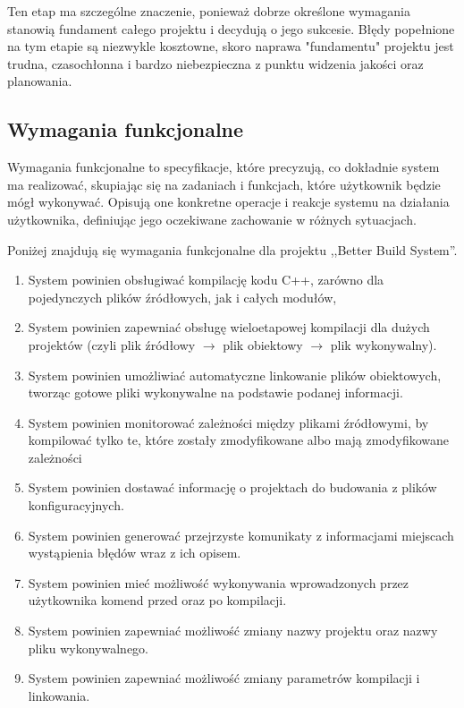 Ten etap  ma szczególne znaczenie, ponieważ dobrze określone wymagania stanowią fundament całego projektu i decydują o jego sukcesie. Błędy popełnione na tym etapie są niezwykle kosztowne, skoro naprawa "fundamentu" projektu jest trudna, czasochłonna i bardzo niebezpieczna z punktu widzenia jakości oraz planowania.

\subsection{Wymagania funkcjonalne}
Wymagania funkcjonalne to specyfikacje, które precyzują, co dokładnie system ma realizować, skupiając się na zadaniach i funkcjach, które użytkownik będzie mógł wykonywać. Opisują one konkretne operacje i reakcje systemu na działania użytkownika, definiując jego oczekiwane zachowanie w różnych sytuacjach.

Poniżej znajdują się wymagania funkcjonalne dla projektu ,,Better Build System''.
\begin{enumerate}
    \item System powinien obsługiwać kompilację kodu C++, zarówno dla pojedynczych plików źródłowych, jak i całych modułów, 
    \item System powinien zapewniać obsługę wieloetapowej kompilacji dla dużych projektów (czyli plik źródłowy $\rightarrow$ plik obiektowy $\rightarrow$ plik wykonywalny).
    \item System powinien umożliwiać automatyczne linkowanie plików obiektowych, tworząc gotowe pliki wykonywalne na podstawie podanej informacji.
    \item System powinien monitorować zależności między plikami źródłowymi, by kompilować tylko te, które zostały zmodyfikowane albo mają zmodyfikowane zależności
    \item System powinien dostawać informację o projektach do budowania z plików konfiguracyjnych.
    \item System powinien generować przejrzyste komunikaty z informacjami miejscach wystąpienia błędów wraz z ich opisem.
    \item System powinien mieć możliwość wykonywania wprowadzonych przez użytkownika komend przed oraz po kompilacji.
    \item System powinien zapewniać możliwość zmiany nazwy projektu oraz nazwy pliku wykonywalnego.
    \item System powinien zapewniać możliwość zmiany parametrów kompilacji i linkowania.
\end{enumerate}

